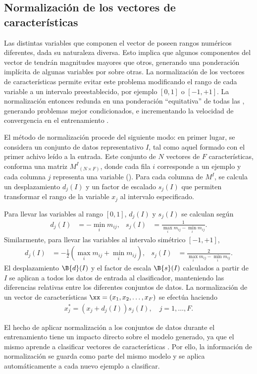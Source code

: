 %
%
%
\subsection{Normalización de los vectores de características}
%
Las distintas variables que componen el vector de 
poseen rangos numéricos diferentes, dada su naturaleza diversa.
Esto implica que algunos componentes del vector de 
tendrán magnitudes mayores que otros, generando una ponderación
implícita de algunas variables por sobre otras.
La normalización de los vectores de características permite evitar
este problema modificando el rango de cada variable a un intervalo
preestablecido, por ejemplo $[0,1]$ o $[-1,+1]$.
La normalización entonces redunda en una ponderación ``equitativa'' de
todas las , generando problemas mejor condicionados, e
incrementando la velocidad de convergencia en el entrenamiento
\cite{nnfaq2}.

El método de normalización procede del siguiente modo: en
primer lugar, se considera un conjunto de datos representativo
$I$, tal como aquel formado con el primer achivo leído a la entrada.
Este conjunto de ${N}$ vectores de $F$ características, conforma una
matriz $M^I{}_{({N}\times{}F)}$, donde cada fila $i$ corresponde
a un ejemplo y cada columna $j$ representa una variable
(\caract{}). Para cada columna de $M^I$, se calcula un desplazamiento
$d_j(I)$ y un factor de escalado $s_j(I)$ que permiten transformar el
rango de la variable $x_j$ al intervalo especificado.

Para llevar las variables al rango $[0,1]$, $d_j(I)$ y $s_j(I)$ se
calculan según
%
\begin{align}
  d_j(I) &= - \min_i m_{ij}, &
  s_j(I) &= \frac{1}{\max_i m_{ij} - \min_i m_{ij}}.
\end{align}
%
Similarmente, para llevar las variables al intervalo simétrico
$[-1,+1]$,
%
\begin{align}
  d_j(I) &= -\frac{1}{2}\left(\max_i m_{ij} + \min_i m_{ij}\right), &
  s_j(I) &= \frac{2}{\max_i m_{ij} - \min_i m_{ij}}.
\end{align}
%
El desplazamiento $\B{d}(I)$ y el factor de escala $\B{s}(I)$
calculados a partir de $I$ se aplican a todos los datos
de entrada al clasificador, manteniendo las diferencias relativas
entre los diferentes conjuntos de datos. La normalización de un
vector de características $\xx=(x_{1},x_{2},\ldots,x_{F})$ se
efectúa haciendo
%
\begin{align}
  x_j^{*} = ( x_j + d_j(I) ) s_j(I), \quad j=1,\ldots,F.
\end{align}
%

El hecho de aplicar normalización a los conjuntos de datos durante el
entrenamiento tiene un impacto directo sobre el modelo generado, ya
que el mismo aprende a clasificar vectores de características
. Por ello, la información de normalización se guarda
como parte del mismo modelo y se aplica automáticamente a cada nuevo
ejemplo a clasificar.
